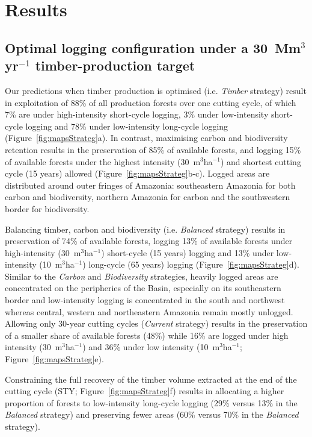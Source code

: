 \documentclass[12pt]{article}
\begin{document}
\section*{Results}

\subsection*{Optimal logging configuration under a 30~Mm$^3$yr$^{-1}$ timber-production target}

Our predictions when timber production is optimised (i.e. \textit{Timber} strategy) result in exploitation of 88\% of all production forests over one cutting cycle, of which 7\% are under high-intensity short-cycle logging, 3\% under low-intensity short-cycle logging and 78\% under low-intensity long-cycle logging (Figure~\ref{fig:mapsStrateg}a). In contrast, maximising carbon and biodiversity retention results in the preservation of 85\% of available forests, and logging 15\% of available forests under the highest intensity (30~m$^3$ha$^{-1}$) and shortest cutting cycle (15 years) allowed (Figure~\ref{fig:mapsStrateg}b-c). Logged areas are distributed around outer fringes of Amazonia: southeastern Amazonia for both carbon and biodiversity, northern Amazonia for carbon and the southwestern border for biodiversity. 

Balancing timber, carbon and biodiversity (i.e. \textit{Balanced} strategy) results in preservation of 74\% of available forests, logging 13\% of available forests under high-intensity (30~m$^3$ha$^{-1}$) short-cycle (15 years) logging and 13\% under low-intensity (10~m$^3$ha$^{-1}$) long-cycle (65 years) logging (Figure~\ref{fig:mapsStrateg}d). Similar to the \textit{Carbon} and \textit{Biodiversity} strategies, heavily logged areas are concentrated on the peripheries of the Basin, especially on its southeastern border and low-intensity logging is concentrated in the south and northwest whereas central, western and northeastern Amazonia remain mostly unlogged. Allowing only 30-year cutting cycles (\textit{Current} strategy) results in the preservation of a smaller share of available forests (48\%) while 16\% are logged under high intensity (30~m$^3$ha$^{-1}$) and 36\% under low intensity (10~m$^3$ha$^{-1}$;  Figure~\ref{fig:mapsStrateg}e). 

Constraining the full recovery of the timber volume extracted at the end of the cutting cycle (STY; Figure~\ref{fig:mapsStrateg}f) results in allocating a higher proportion of forests to low-intensity long-cycle logging (29\% versus 13\% in the \textit{Balanced} strategy) and preserving fewer areas (60\% versus 70\% in the \textit{Balanced} strategy).
\end{document}
